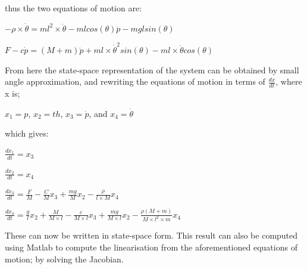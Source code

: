 \documentclass[12pt]{article}
\begin{document}
\vspace{\baselineskip}

thus the two equations of motion are:


\vspace{\baselineskip}


$ -\rho \times \dot{\theta} = m l^2 \times \ddot{\theta} - m l cos(\theta) \ddot{p} - m g l sin(\theta)$


\vspace{\baselineskip}



$F - c \dot{p} = (M+m) \ddot{p} + m l \times \dot{\theta}^2 sin(\theta) - m l \times \ddot{\theta} cos(\theta)$


\vspace{\baselineskip}



From here the state-space representation of the system can be obtained by small angle approximation, and rewriting the equations of motion in terms of $\frac{dx}{dt}$, where x is;


\vspace{\baselineskip}


$x_1 = p$, $x_2 = th$, $x_3 = \dot{p}$, and $x_4 = \dot{\theta}$


\vspace{\baselineskip}


which gives:


\vspace{\baselineskip}


$\frac{d x_1}{dt} = x_3$


\vspace{\baselineskip}


$\frac{d x_2}{dt} = x_4$


\vspace{\baselineskip}


$\frac{d x_3}{dt} = \frac{F}{M} - \frac{C}{M} x_3 + \frac{mg}{M} x_2 - \frac{\rho}{l\times M} x_4$


\vspace{\baselineskip}


$\frac{d x_4}{dt} = \frac{g}{l} x_2 + \frac{M}{M \times l} - \frac{c}{M \times l} x_3 + \frac{mg}{M \times l} x_2 - \frac{\rho (M+m)}{M\times l^2 \times m} x_4$


\vspace{\baselineskip}


These can now be written in state-space form. This result can also be computed using Matlab to compute the linearisation from the aforementioned equations of motion; by solving the Jacobian.
\end{document}
